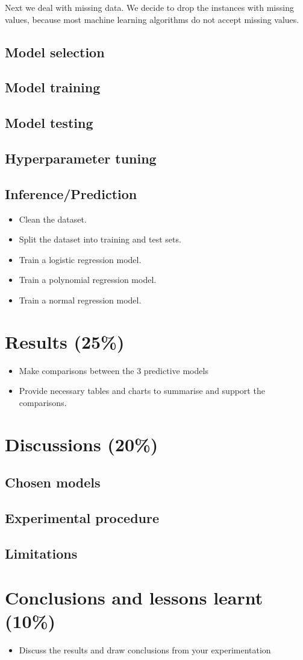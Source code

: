 \documentclass[twoside,11pt]{article}
\begin{document}
Next we deal with missing data. We decide to drop the instances with missing values, because most machine learning algorithms do not accept missing values.

\subsection{Model selection}
\subsection{Model training}
\subsection{Model testing}
\subsection{Hyperparameter tuning}
\subsection{Inference/Prediction}
\begin{itemize}
    \item Clean the dataset.
    \item Split the dataset into training and test sets.
    \item Train a logistic regression model.
    \item Train a polynomial regression model.
    \item Train a normal regression model.
\end{itemize}

\section{Results (25\%)}
\begin{itemize}
    \item Make comparisons between the 3 predictive models
    \item Provide necessary tables and charts to summarise and support the comparisons.
\end{itemize}

\section{Discussions (20\%)}
\subsection{Chosen models}
\subsection{Experimental procedure}
\subsection{Limitations}

\section{Conclusions and lessons learnt (10\%)}
\begin{itemize}
    \item Discuss the results and draw conclusions from your experimentation
\end{itemize}




\vskip 0.2in

\end{document}
